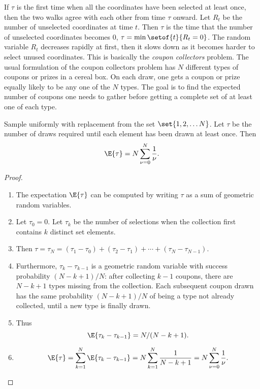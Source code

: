 \documentclass[12pt]{article}
\begin{document}
If \( \tau \) is the first time when all the coordinates have been
selected at least once, then the two walks agree with each other from
time \( \tau \) onward.  Let \( R_t \) be the number of unselected
coordinates at time \( t \).  Then \( \tau \) is the time that the
number of unselected coordinates becomes \( 0 \), \( \tau = \min\setof{t}
{R_t = 0} \). The random variable \( R_t \) decreases rapidly at first,
then it slows down as it becomes harder to select unused coordinates.
This is basically the \emph{coupon collectors} problem.
The usual formulation of the coupon collectors problem%
has \( N \) different types of coupons or prizes in a cereal box. On
each draw, one gets a coupon or prize equally likely to be any one of
the \( N \) types.  The goal is to find the expected number of coupons
one needs to gather before getting a complete set of at least one of
each type.

\begin{proposition}
    Sample uniformly with replacement from the set \( \set{1, 2, \dots N}
    \).  Let \( \tau \) be the number of draws required until each
    element has been drawn at least once.  Then
    \[
        \E{\tau} = N \sum_{\nu=0}^N \frac{1}{\nu}.
    \]
\end{proposition}

\begin{proof}
    \begin{enumerate}
        \item
            The expectation \( \E{\tau} \) can be computed by writing \(
            \tau \) as a sum of geometric random variables.
        \item
            Let \( \tau_0 = 0 \).  Let \( \tau_k \) be the number of
            selections when the collection first contains \( k \)
            distinct set elements.
        \item
            Then \( \tau = \tau_N = (\tau_1 -\tau_0) + (\tau_2 - \tau_1)
            + \cdots + (\tau_N - \tau_{N-1}) \).
        \item
            Furthermore, \( \tau_k - \tau_{k-1} \) is a geometric random
            variable with success probability \( (N-k+1)/N \):  after
            collecting \( k-1 \) coupons, there are \( N-k+1 \) types
            missing from the collection.  Each subsequent coupon drawn
            has the same probability \( (N - k + 1)/N \) of being a type
            not already collected, until a new type is finally drawn.
        \item
            Thus
            \[
                \E{\tau_k - \tau_{k-1}} = N/(N - k + 1).
            \]
        \item
            \[
                \E{\tau} = \sum_{k=1}^{N} \E{\tau_k - \tau_{k-1}} = N
                \sum_{k=1}^N \frac{1}{N-k+1} = N\sum_{\nu=0}^N \frac{1}{\nu}.
            \]
    \end{enumerate}
\end{proof}
\end{document}
